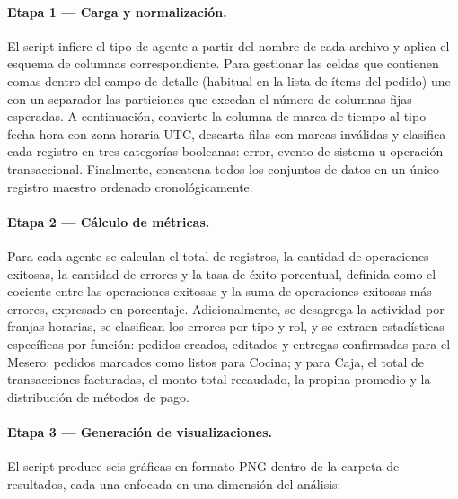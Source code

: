 \paragraph{Etapa 1 — Carga y normalización.} El script infiere el tipo de agente a partir del nombre de cada archivo y aplica el esquema de columnas correspondiente. Para gestionar las celdas que contienen comas dentro del campo de detalle (habitual en la lista de ítems del pedido) une con un separador las particiones que excedan el número de columnas fijas esperadas. A continuación, convierte la columna de marca de tiempo al tipo fecha-hora con zona horaria UTC, descarta filas con marcas inválidas y clasifica cada registro en tres categorías booleanas: error, evento de sistema u operación transaccional. Finalmente, concatena todos los conjuntos de datos en un único registro maestro ordenado cronológicamente.

\paragraph{Etapa 2 — Cálculo de métricas.} Para cada agente se calculan el total de registros, la cantidad de operaciones exitosas, la cantidad de errores y la tasa de éxito porcentual, definida como el cociente entre las operaciones exitosas y la suma de operaciones exitosas más errores, expresado en porcentaje. Adicionalmente, se desagrega la actividad por franjas horarias, se clasifican los errores por tipo y rol, y se extraen estadísticas específicas por función: pedidos creados, editados y entregas confirmadas para el Mesero; pedidos marcados como listos para Cocina; y para Caja, el total de transacciones facturadas, el monto total recaudado, la propina promedio y la distribución de métodos de pago.

\paragraph{Etapa 3 — Generación de visualizaciones.} El script produce seis gráficas en formato PNG dentro de la carpeta de resultados, cada una enfocada en una dimensión del análisis:

